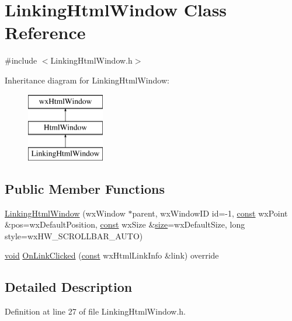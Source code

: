 \hypertarget{class_linking_html_window}{}\section{Linking\+Html\+Window Class Reference}
\label{class_linking_html_window}


{\ttfamily \#include $<$Linking\+Html\+Window.\+h$>$}

Inheritance diagram for Linking\+Html\+Window\+:\begin{figure}[H]
\begin{center}
\leavevmode
\includegraphics[height=3.000000cm]{class_linking_html_window}
\end{center}
\end{figure}
\subsection*{Public Member Functions}
\begin{DoxyCompactItemize}
\item 
\hyperlink{class_linking_html_window_a77c55273247b6b15b6acc31dc7d9e1a0}{Linking\+Html\+Window} (wx\+Window $\ast$parent, wx\+Window\+ID id=-\/1, \hyperlink{getopt1_8c_a2c212835823e3c54a8ab6d95c652660e}{const} wx\+Point \&pos=wx\+Default\+Position, \hyperlink{getopt1_8c_a2c212835823e3c54a8ab6d95c652660e}{const} wx\+Size \&\hyperlink{group__lavu__mem_ga854352f53b148adc24983a58a1866d66}{size}=wx\+Default\+Size, long style=wx\+H\+W\+\_\+\+S\+C\+R\+O\+L\+L\+B\+A\+R\+\_\+\+A\+U\+TO)
\item 
\hyperlink{sound_8c_ae35f5844602719cf66324f4de2a658b3}{void} \hyperlink{class_linking_html_window_aade8fce39f593e9b0af216ecb87a93a4}{On\+Link\+Clicked} (\hyperlink{getopt1_8c_a2c212835823e3c54a8ab6d95c652660e}{const} wx\+Html\+Link\+Info \&link) override
\end{DoxyCompactItemize}


\subsection{Detailed Description}


Definition at line 27 of file Linking\+Html\+Window.\+h.



